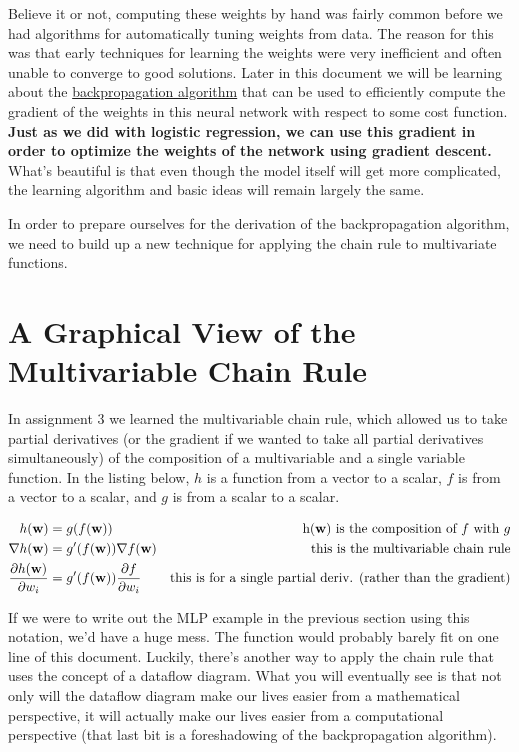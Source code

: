 \documentclass[assignment06_Solutions]{subfiles}
\begin{document}
Believe it or not, computing these weights by hand was fairly common before we had algorithms for automatically tuning weights from data.  The reason for this was that early techniques for learning the weights were very inefficient and often unable to converge to good solutions.  Later in this document we will be learning about the \href{https://en.wikipedia.org/wiki/Backpropagation}{backpropagation algorithm} that can be used to efficiently compute the gradient of the weights in this neural network with respect to some cost function.  \textbf{Just as we did with logistic regression, we can use this gradient in order to optimize the weights of the network using gradient descent.}  What's beautiful is that even though the model itself will get more complicated, the learning algorithm and basic ideas will remain largely the same.

In order to prepare ourselves for the derivation of the backpropagation algorithm, we need to build up a new technique for applying the chain rule to multivariate functions.


\section{A Graphical View of the Multivariable Chain Rule}

In assignment 3 we learned the multivariable chain rule, which allowed us to take partial derivatives (or the gradient if we wanted to take all partial derivatives simultaneously) of the composition of a multivariable and a single variable function.  In the listing below, $h$ is a function from a vector to a scalar, $f$ is from a vector to a scalar, and $g$ is from a scalar to a scalar.

\begin{align}
h(\mathbf{w}) &= g(f(\mathbf{w}))&\mbox{h($\mathbf{w}$) is the composition of $f$ with $g$} \nonumber \\
\nabla h(\mathbf{w}) &= g'(f(\mathbf{w})) \nabla f(\mathbf{w}) & \mbox{this is the multivariable chain rule} \\
\frac{\partial h(\mathbf{w})}{\partial w_i} &= g'(f(\mathbf{w})) \frac{\partial f}{\partial w_i}& \mbox{this is for a single partial deriv. (rather than the gradient)}
\end{align}

If we were to write out the MLP example in the previous section using this notation, we'd have a huge mess.  The function would probably barely fit on one line of this document.  Luckily, there's another way to apply the chain rule that uses the concept of a dataflow diagram.  What you will eventually see is that not only will the dataflow diagram make our lives easier from a mathematical perspective, it will actually make our lives easier from a computational perspective (that last bit is a foreshadowing of the backpropagation algorithm).
\end{document}
